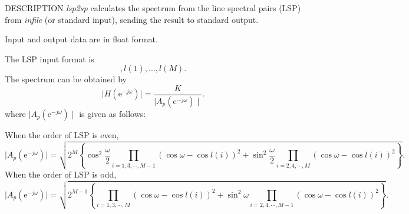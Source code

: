 \begin{synopsis}
\item[lsp2sp] [ --m $M$ ] [ --s $S$ ] [ --l $L$ ] [ --L ] [ --k ] [ --i $I$ ] [ --o $O$ ] [ {\em infile} ]
\end{synopsis}

\begin{qsection}{DESCRIPTION}
{\em lsp2sp} calculates the spectrum from the line spectral pairs (LSP)
from {\em infile} (or standard input),
sending the result to standard output.

Input and output data are in float format.

The LSP input format is
 \begin{displaymath}
  [ K ], l(1), \dots, l(M).
 \end{displaymath}
The spectrum can be obtained by
  \begin{displaymath}
   \mid H(\mathrm{e}^{-j\omega}) \mid = \frac{K}{\mid A_p(\mathrm{e}^{-j\omega}) \mid}.
  \end{displaymath}
where $\mid A_p(\mathrm{e}^{-j\omega}) \mid$ is given as follows:

When the order of LSP is even, 
  \begin{displaymath}
   \mid A_p(\mathrm{e}^{-j\omega}) \mid = \sqrt{ 2^M \left\{ \cos^2 \frac{\omega}{2}\prod_{i=1,3,\cdots,M-1}(\cos \omega - \cos l(i))^2 + \sin^2 \frac{\omega}{2}\prod_{i=2,4,\cdots,M}(\cos \omega - \cos l(i))^2 \right\} }.
  \end{displaymath}
When the order of LSP is odd,
 \begin{displaymath}
  \mid A_p(\mathrm{e}^{-j\omega}) \mid = \sqrt{ 2^{M-1} \left\{ \prod_{i=1,3,\cdots,M}(\cos \omega - \cos l(i))^2 + \sin^2 \omega \prod_{i=2,4,\cdots,M-1}(\cos \omega - \cos l(i))^2 \right\} }.
 \end{displaymath}
\end{qsection}

